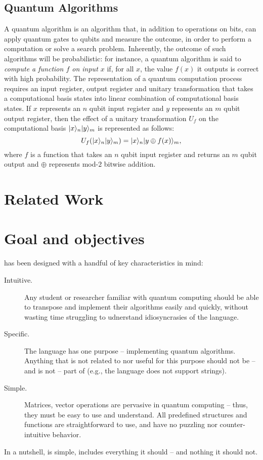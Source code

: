 \subsection{Quantum Algorithms}
A quantum algorithm is an algorithm that, in addition to operations on bits, can apply quantum gates to qubits and measure the outcome, in order to perform a computation or solve a search problem. Inherently, the outcome of such algorithms will be probabilistic: for instance, a quantum algorithm is said to \emph{compute a function $f$ on input $x$} if, for all $x$, the value $f(x)$ it outputs is correct with high probability.
  The representation of a quantum computation process requires an input register, output register and unitary transformation that takes a computational basis states into linear combination of computational basis states. If $x$ represents an $n$ qubit input register and $y$ represents an $m$ qubit output register, then the effect of a unitary transformation $U_f$ on the computational basis $|x\rangle_n|y\rangle_m$ is represented as follows:
	\begin{equation}
	U_f(|x\rangle_n|y\rangle_m)=|x\rangle_n|y\oplus f(x)\rangle_m,
	\end{equation}
	where $f$ is a function that takes an $n$ qubit input register and returns an $m$ qubit output and $\oplus$ represents mod-$2$ bitwise addition.


\section{Related Work}

\section{Goal and objectives}

\QL has been designed with a handful of key characteristics in mind:
\begin{description}
  \item[Intuitive.] Any student or researcher familiar with quantum computing should be able to transpose and implement their algorithms easily and quickly, without wasting time struggling to udnerstand idiosyncrasies of the language. 
  \item[Specific.] The language has one purpose -- implementing quantum algorithms. Anything that is not related to nor useful for this purpose should not be -- and is not -- part of \QL (e.g., the language does not support strings).
  \item[Simple.] Matrices, vector operations are pervasive in quantum computing -- thus, they must be easy to use and understand. All predefined structures and functions are straightforward to use, and have no puzzling nor counter-intuitive behavior.
\end{description}
In a nutshell, \QL is simple, includes everything it should -- and nothing it should not.
